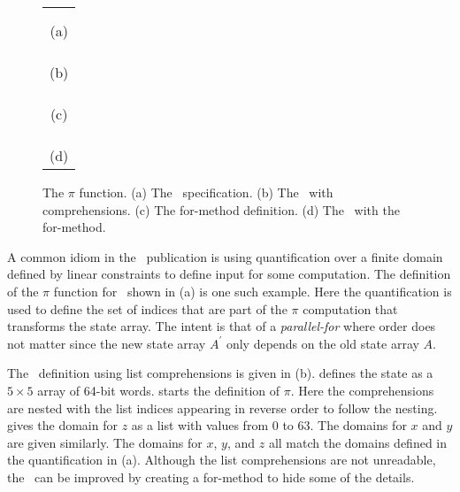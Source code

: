 \begin{figure}[t]
  \begin{center}
    \begin{tabular}{l}
      \usebox{\fipsPi} \\ \\
      \multicolumn{1}{c}{(a)} \\ \\
      \usebox{\PiCry} \\ \\
      \multicolumn{1}{c}{(b)} \\ \\
      \usebox{\formethod} \\ \\
      \multicolumn{1}{c}{(c)} \\ \\ 
      \usebox{\PiCryLib} \\ \\
      \multicolumn{1}{c}{(d)}
    \end{tabular}
  \end{center}
  \caption{The $\pi$ function. (a) The \fips\ specification. (b) The \cryptol\ with comprehensions. (c) The for-method definition. (d) The \cryptol\ with the for-method.}
  \label{fig:pi}
\end{figure}

A common idiom in the \fips\ publication is using quantification over a finite domain defined by linear constraints to define input for some computation.
The definition of the $\pi$ function for \keccak\ shown in (a) is one such example.
Here the quantification is used to define the set of indices that are part of the $\pi$ computation that transforms the state array. The intent is that of a \emph{parallel-for} where order does not matter since the new state array $A^\prime$ only depends on the old state array $A$.

The \cryptol\ definition using list comprehensions is given in (b).
 defines the state as a $5 \times 5$ array of 64-bit words.
 starts the definition of $\pi$. 
Here the comprehensions are nested with the list indices appearing in reverse order to follow the nesting.
 gives the domain for $z$ as a list with values from 0 to 63.
The domains for $x$ and $y$ are given similarly.
The domains for $x$, $y$, and $z$ all match the domains defined in the quantification in (a).
Although the list comprehensions are not unreadable, the \cryptol\ can be improved by creating a for-method to hide some of the details.

